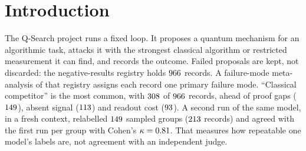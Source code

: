 \documentclass[10pt]{article}
\begin{document}
\begin{abstract}
Separately, a rediscovery audit of the project's $\RedTotal$ retained negative results, which does not cover Results A--C, labels $\RedPublished$ of them as restating a published barrier; $\RedReadPublished$ of these are among the $\RedShown$ records a judge read, and the rest inherit their cluster's label. No result here is a new quantum algorithm, a speedup claim or a hardness claim, and most derivations are marked review pending in their source notes.
\end{abstract}

\section{Introduction}
\label{sec:intro}

The Q-Search project runs a fixed loop. It proposes a quantum mechanism for an algorithmic task, attacks it with the strongest classical algorithm or restricted measurement it can find, and records the outcome. Failed proposals are kept, not discarded: the negative-results registry holds $\RedTotal$ records. A failure-mode meta-analysis of that registry assigns each record one primary failure mode. ``Classical competitor'' is the most common, with $308$ of $966$ records, ahead of proof gaps ($149$), absent signal ($113$) and readout cost ($93$). A second run of the same model, in a fresh context, relabelled $149$ sampled groups ($213$ records) and agreed with the first run per group with Cohen's $\kappa=0.81$. That measures how repeatable one model's labels are, not agreement with an independent judge.
\end{document}
